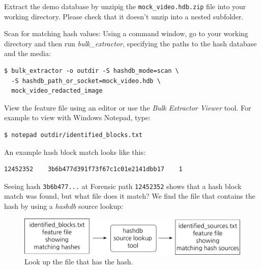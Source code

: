 \documentclass[12pt,twoside]{article}
\newcommand{\hdb}{\emph{hashdb}\xspace}
\newcommand{\bulk}{\emph{bulk\_extractor}\xspace}
\newcommand{\bev}{\emph{Bulk Extractor Viewer}\xspace}
\begin{document}
\begin{compactenum}
\item Extract the demo database
by unzipig the \texttt{mock\_video.hdb.zip} file
into your working directory.
Please check that it doesn't unzip into a nested subfolder.
\item Scan for matching hash values: Using a command window, go to your working directory and then run \bulk,
specifying the paths to the hash database and the media:
\begin{verbatim}
$ bulk_extractor -o outdir -S hashdb_mode=scan \
  -S hashdb_path_or_socket=mock_video.hdb \
  mock_video_redacted_image
\end{verbatim}
\item View the feature file using an editor or use the \bev tool.
For example to view with Windows Notepad, type:
\begin{verbatim}
$ notepad outdir/identified_blocks.txt
\end{verbatim}
An example hash block match looks like this:
\begin{verbatim}
12452352    3b6b477d391f73f67c1c01e2141dbb17    1
\end{verbatim}
\end{compactenum}

Seeing hash \texttt{3b6b477...} at Forensic path \texttt{12452352}
shows that a hash block match was found, but what file does it match?
We find the file that contains the hash by using a \hdb source lookup:
\begin{figure}[H]
  \center
  \includegraphics[scale=0.6]{drawings/source_lookup}
  \caption*{Look up the file that has the hash.}
  \label{fig:source_lookup}
\end{figure}
\end{document}
